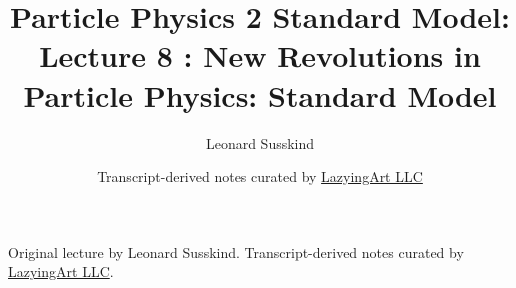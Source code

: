 \documentclass[11pt,oneside]{book}
\begin{document}
\frontmatter
\title{Particle Physics 2 Standard Model: Lecture 8 : New Revolutions in Particle Physics: Standard Model}
\author{Leonard Susskind}
\date{Transcript-derived notes curated by \href{https://lazying.art}{LazyingArt LLC}}
\maketitle
\begin{center}
\small Original lecture by Leonard Susskind. Transcript-derived notes curated by \href{https://lazying.art}{LazyingArt LLC}.
\end{center}
\clearpage
\mainmatter

\end{document}
